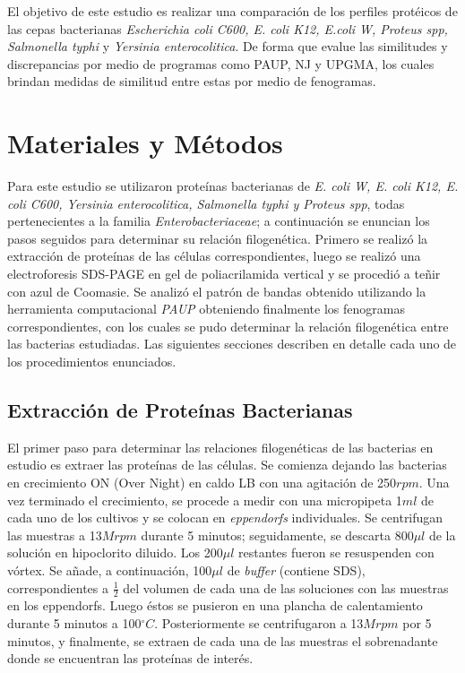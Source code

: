 \documentclass[%
 reprint,
 amsmath,amssymb,
 aps,
showkeys,
letter,
12pts
]{revtex4-1}
\begin{document}
	El objetivo de este estudio  es realizar una comparación de los perfiles protéicos de las cepas bacterianas \textit{Escherichia coli C600, E. coli K12, E.coli W, Proteus spp, Salmonella typhi} y \textit{Yersinia enterocolitica}. De forma que evalue las similitudes y discrepancias  por medio de programas como PAUP, NJ y UPGMA, los cuales brindan medidas de similitud entre estas por medio de fenogramas.
	

\section{\label{sec:MyM}Materiales y Métodos} %
	Para este estudio se utilizaron proteínas bacterianas de \textit{E. coli W, E. coli K12, E. coli C600, Yersinia enterocolitica, Salmonella typhi y Proteus spp},  todas pertenecientes a la familia \textit{Enterobacteriaceae}; a continuación se enuncian los pasos seguidos para determinar su relación filogenética.
	Primero se realizó la extracción de proteínas de las células correspondientes, luego se realizó una electroforesis SDS-PAGE en gel de poliacrilamida vertical y se procedió a teñir con azul de Coomasie. Se analizó el patrón de bandas obtenido utilizando la herramienta computacional \textit{PAUP} obteniendo finalmente los fenogramas correspondientes, con los cuales se pudo determinar la relación filogenética entre las bacterias estudiadas. Las siguientes secciones describen en detalle cada uno de los procedimientos enunciados.
	
	\subsection{\label{sec:ExtraMet}Extracción de Proteínas Bacterianas}\cite{guia}
		El primer paso para determinar las relaciones filogenéticas de las bacterias en estudio es extraer las proteínas de las células.
		Se comienza dejando las bacterias en crecimiento ON (Over Night) en caldo LB con una agitación de 250$rpm$. Una vez terminado el crecimiento, se procede a medir con una micropipeta 1$ml$ de cada uno de los cultivos y se colocan en \textit{eppendorfs} individuales. Se centrifugan las muestras a 13$Mrpm$ durante 5 minutos; seguidamente, se descarta 800$\mu l$ de la solución en hipoclorito diluido. Los 200$\mu l$ restantes fueron se resuspenden con vórtex. Se añade, a continuación, 100$\mu l$ de \textit{buffer} (contiene SDS), correspondientes a $\frac{1}{2}$ del volumen de cada una de las soluciones con las muestras en los eppendorfs. Luego éstos se pusieron en una plancha de calentamiento durante 5 minutos a 100$^{\circ}C$. Posteriormente se centrifugaron a 13$Mrpm$ por 5 minutos, y finalmente, se extraen de cada una de las muestras el sobrenadante donde se encuentran las proteínas de interés.
		
\end{document}

